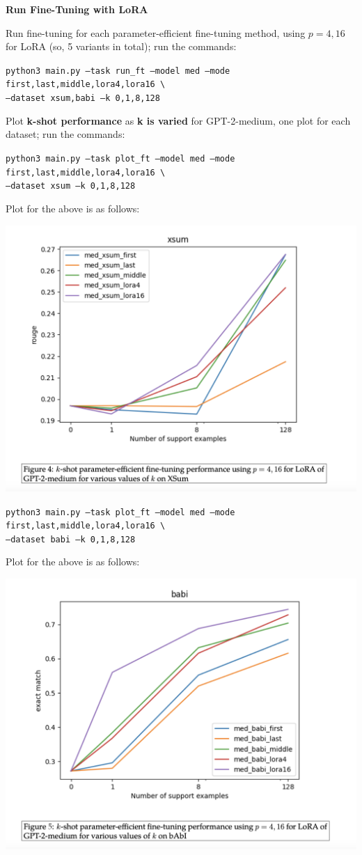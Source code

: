\item {} {\bf Run Fine-Tuning with LoRA}

Run fine-tuning for each parameter-efficient fine-tuning method, using $p=4,16$ for LoRA (so, 5 variants in total); run the commands:

{\small \texttt{python3 main.py --task run\_ft --model med --mode first,last,middle,lora4,lora16 \textbackslash \\
\phantom{asdf}--dataset xsum,babi --k 0,1,8,128}}

Plot \textbf{k-shot performance} as \textbf{k is varied} for GPT-2-medium, one plot for each dataset; run the commands:

{\small \texttt{python3 main.py --task plot\_ft --model med --mode first,last,middle,lora4,lora16 \textbackslash \\
\phantom{asdf}--dataset xsum --k 0,1,8,128}}

Plot for the above is as follows:
\begin{center}
    \includegraphics[width=0.75\linewidth]{./figures/parameter-3ci}
\end{center}

{\small \texttt{python3 main.py --task plot\_ft --model med --mode first,last,middle,lora4,lora16 \textbackslash \\
\phantom{asdf}--dataset babi --k 0,1,8,128}}

Plot for the above is as follows:
\begin{center}
    \includegraphics[width=0.75\linewidth]{./figures/parameter-3cii}
\end{center}
